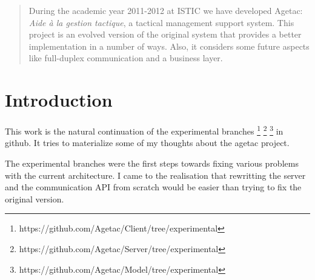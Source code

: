 \documentclass[12pt]{scrartcl}
\begin{document}
\maketitle

\begin{abstract}
During the academic year 2011-2012 at ISTIC we have developed Agetac: \emph{Aide à la gestion tactique}, a tactical management support system. This project is an evolved version of the original system that provides a better implementation in a number of ways. Also, it considers some future aspects like full-duplex communication and a business layer.
\end{abstract}

\thispagestyle{empty} %
\newpage
{} %

\tableofcontents
\newpage

\section*{Introduction}

This work is the natural continuation of the experimental branches \footnote{https://github.com/Agetac/Client/tree/experimental} \footnote{https://github.com/Agetac/Server/tree/experimental} \footnote{https://github.com/Agetac/Model/tree/experimental} in github. It tries to materialize some of my thoughts about the agetac project.


The experimental branches were the first steps towards fixing various problems with the current architecture. I came to the realisation that rewritting the server and the communication API from scratch would be easier than trying to fix the original version.



\end{document}

